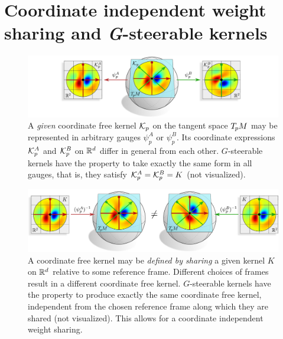

\section{Coordinate independent weight sharing and \textit{G}-steerable kernels}
\label{apx:coord_indep_weight_sharing}


\begin{figure}
    \centering
    \includegraphics[width=1.\columnwidth]{figures/kernel_apx_coordinatization.pdf}
    \vspace*{-3.5ex}
    \caption{\small
        A \emph{given} coordinate free kernel $\mathcal{K}_p$ on the tangent space $T_{\mkern-1.5mu p}\mkern-.5muM$ may be represented in arbitrary gauges $\psi_p^A$ or $\psi_p^B$.
        Its coordinate expressions $\mathcal{K}_p^A$ and $\mathcal{K}_p^B$ on $\mathbb{R}^d$ differ in general from each other.
        $G$-steerable kernels have the property to take exactly the same form in all gauges, that is, they satisfy $\mathcal{K}_p^A = \mathcal{K}_p^B = K$ (not visualized).
        }
    \label{fig:kernel_apx_coordinatization}
\end{figure}


\begin{figure}
    \centering
    \includegraphics[width=1.\columnwidth]{figures/kernel_apx_sharing.pdf}
    \vspace*{-3.5ex}
    \caption{\small
        A coordinate free kernel may be \emph{defined by sharing} a given kernel $K$ on $\mathbb{R}^d$ relative to some reference frame.
        Different choices of frames result in a different coordinate free kernel.
        $G$-steerable kernels have the property to produce exactly the same coordinate free kernel, independent from the chosen reference frame along which they are shared (not visualized).
        This allows for a coordinate independent weight sharing.
        }
    \label{fig:kernel_apx_sharing}
\end{figure}


